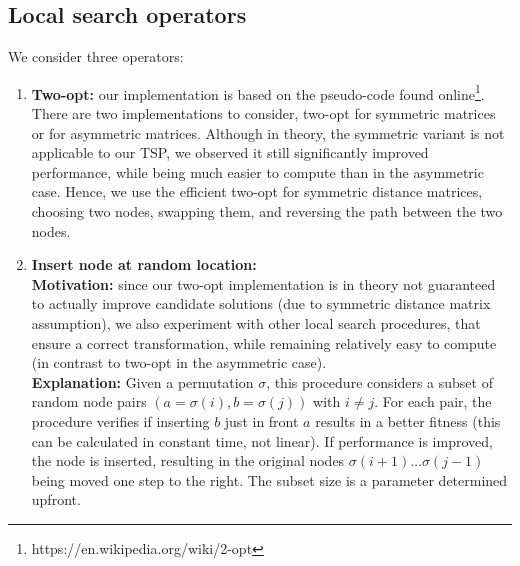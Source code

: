 \documentclass[a4paper,10pt]{article}
\begin{document}
\subsection{Local search operators} \label{cha:local search}
	We consider three operators:
	\begin{enumerate}
		\item \textbf{Two-opt:} our implementation is based on the pseudo-code found online\footnote{https://en.wikipedia.org/wiki/2-opt}. There are two implementations to consider, two-opt for symmetric matrices or for asymmetric matrices. Although in theory, the symmetric variant is not applicable to our TSP, we observed it still significantly improved performance, while being much easier to compute than in the asymmetric case. Hence, we use the efficient two-opt for symmetric distance matrices, choosing two nodes, swapping them, and reversing the path between the two nodes.
		
		\item \textbf{Insert node at random location:}\\
		\textbf{Motivation:} since our two-opt implementation is in theory not guaranteed to actually improve candidate solutions (due to symmetric distance matrix assumption), we also experiment with other local search procedures, that ensure a correct transformation, while remaining relatively easy to compute (in contrast to two-opt in the asymmetric case). \\
		\textbf{Explanation:} Given a permutation $\sigma$, this procedure considers a subset of random node pairs $\left(a = \sigma(i), b = \sigma(j)\right)$ with $i \neq j$. For each pair, the procedure verifies if inserting $b$ just in front $a$ results in a better fitness (this can be calculated in constant time, not linear). If performance is improved, the node is inserted, resulting in the original nodes $\sigma(i+1) \dots \sigma(j-1)$ being moved one step to the right. The subset size is a parameter determined upfront.


\end{enumerate}
\end{document}
